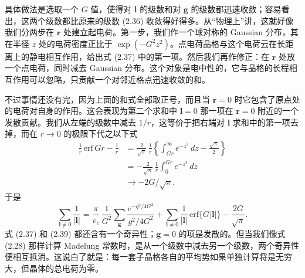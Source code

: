 具体做法是选取一个 $G$ 值，使得对 $\boldsymbol{l}$ 的级数和对 $\boldsymbol{g}$ 的级数都迅速收敛；容易看出，这两个级数都比原来的级数 (2.36) 收敛得好得多。从“物理上”讲，这就好像我们分两步在 $\mathbf{r}$ 处建立起电荷。第一步，我们作一个球对称的 Gaussian 分布，其在半径 $z$ 处的电荷密度正比于 $\exp(-G^2z^2)$。点电荷晶格与这个电荷云在长距离上的静电相互作用，给出式 (2.37) 中的第一项。然后我们再作修正：在 $\mathbf{r}$ 处放一个点电荷，同时减去 Gaussian 分布。这个对象是电中性的，它与晶格的长程相互作用可以忽略，只贡献一个对邻近格点迅速收敛的和。

不过事情还没有完，因为上面的和式全部取正号，而且当 $\mathbf{r}=0$ 时它包含了原点处的电荷对自身的作用。这会表现为第二个求和中 $\boldsymbol{l}=0$ 那一项在 $\mathbf{r}=0$ 附近的一个发散贡献。我们从左端的级数中减去 $1/r$，这等价于把右端对 $\boldsymbol{l}$ 求和中的第一项去掉，而在 $r\to 0$ 的极限下代之以下式
\begin{align*}
\frac{1}{r}\,\mathrm{erf}\,Gr - \frac{1}{r} &= \frac{2}{\sqrt{\pi}}\,\frac{1}{r}\left\{\int_{Gr}^{\infty} e^{-z^2}\, dz - \frac{\sqrt{\pi}}{2}\right\} \\
&= -\frac{2}{\sqrt{\pi}}\,\frac{1}{r}\int_0^{Gr} e^{-z^2}\, dz \\
&\to -2G/\sqrt{\pi}.
\tag{2.38}
\end{align*}
于是
\begin{equation*}
\sum_{\boldsymbol{l}\neq 0}\frac{1}{|\boldsymbol{l}|} = \frac{\pi}{v_c}\,\frac{1}{G^2}\sum_{\boldsymbol{g}}\frac{e^{-g^2/4G^2}}{g^2/4G^2} + \sum_{\boldsymbol{l}\neq 0}\frac{1}{|\boldsymbol{l}|}\,\mathrm{erf}\{G|\boldsymbol{l}|\} - \frac{2G}{\sqrt{\pi}}.
\tag{2.39}
\end{equation*}
式 (2.37) 和 (2.39) 都还含有一个奇异性；$\boldsymbol{g}=0$ 的项是发散的。但当我们像式 (2.28) 那样计算 Madelung 常数时，是从一个级数中减去另一个级数，两个奇异性便相互抵消。这说白了就是：每一套子晶格各自的平均势如果单独计算将是无穷大，但晶体的总电荷为零。

